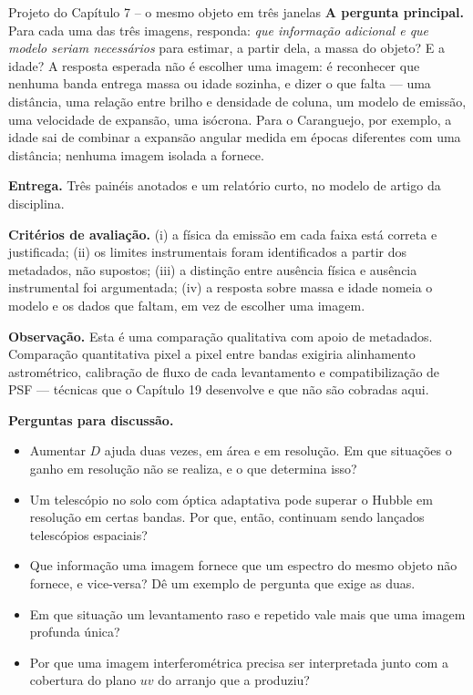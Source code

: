 \documentclass[11pt,a4paper]{article}
\begin{document}
\begin{lessonblock}[borderline west={2pt}{0pt}{astroGold}]{Projeto do Capítulo 7 -- o mesmo objeto em três janelas}
\textbf{A pergunta principal.} Para cada uma das três imagens, responda: \emph{que informação adicional e que
modelo seriam necessários} para estimar, a partir dela, a massa do objeto? E a idade? A resposta esperada não é
escolher uma imagem: é reconhecer que nenhuma banda entrega massa ou idade sozinha, e dizer o que falta --- uma
distância, uma relação entre brilho e densidade de coluna, um modelo de emissão, uma velocidade de expansão, uma
isócrona. Para o Caranguejo, por exemplo, a idade sai de combinar a expansão angular medida em épocas diferentes
com uma distância; nenhuma imagem isolada a fornece.

\textbf{Entrega.} Três painéis anotados e um relatório curto, no modelo de artigo da disciplina.

\textbf{Critérios de avaliação.} (i) a física da emissão em cada faixa está correta e justificada; (ii) os
limites instrumentais foram identificados a partir dos metadados, não supostos; (iii) a distinção entre ausência
física e ausência instrumental foi argumentada; (iv) a resposta sobre massa e idade nomeia o modelo e os dados
que faltam, em vez de escolher uma imagem.

\textbf{Observação.} Esta é uma comparação qualitativa com apoio de metadados. Comparação quantitativa pixel a
pixel entre bandas exigiria alinhamento astrométrico, calibração de fluxo de cada levantamento e compatibilização
de PSF --- técnicas que o Capítulo 19 desenvolve e que não são cobradas aqui.
\end{lessonblock}

\textbf{Perguntas para discussão.}
\begin{itemize}
\item Aumentar $D$ ajuda duas vezes, em área e em resolução. Em que situações o ganho em resolução não se
realiza, e o que determina isso?
\item Um telescópio no solo com óptica adaptativa pode superar o Hubble em resolução em certas bandas. Por que,
então, continuam sendo lançados telescópios espaciais?
\item Que informação uma imagem fornece que um espectro do mesmo objeto não fornece, e vice-versa? Dê um exemplo
de pergunta que exige as duas.
\item Em que situação um levantamento raso e repetido vale mais que uma imagem profunda única?
\item Por que uma imagem interferométrica precisa ser interpretada junto com a cobertura do plano $uv$ do arranjo
que a produziu?
\end{itemize}
\end{document}
